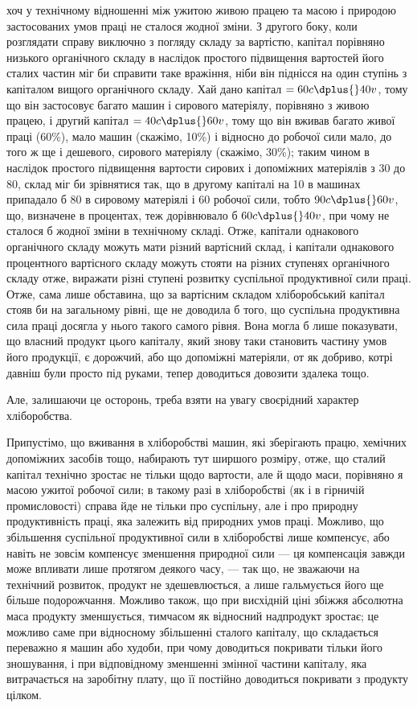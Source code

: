 \parcont{}  %
хоч у технічному відношенні між ужитою живою працею та масою і природою
застосованих умов праці не сталося жодної зміни. З другого боку, коли розглядати
справу виключно з погляду складу за вартістю, капітал порівняно низького
органічного складу в наслідок простого підвищення вартостей його сталих частин
міг би справити таке вражіння, ніби він піднісся на один ступінь з капіталом
вищого органічного складу. Хай дано капітал $= 60c \dplus{} 40v$, тому що він
застосовує багато машин і сирового матеріялу, порівняно з живою працею, і
другий капітал $= 40c \dplus{} 60v$, тому що він вживав багато живої праці (60\%),
мало машин (скажімо, 10\%) і відносно до робочої сили мало, до того ж
ще і дешевого, сирового матеріялу (скажімо, 30\%); таким чином в наслідок простого
підвищення вартости сирових і допоміжних матеріялів з 30 до 80, склад
міг би зрівнятися так, що в другому капіталі на 10 в машинах припадало б 80
в сировому матеріялі і 60 робочої сили, тобто $90c \dplus{} 60v$, що, визначене в процентах,
теж дорівнювало б $60c \dplus{} 40v$, при чому не сталося б жодної зміни в технічному
складі. Отже, капітали однакового органічного складу можуть мати
різний вартісний склад, і капітали однакового процентного вартісного складу
можуть стояти на різних ступенях органічного складу отже, виражати різні ступені
розвитку суспільної продуктивної сили праці. Отже, сама лише обставина,
що за вартісним складом хліборобський капітал стояв би на загальному рівні, ще
не доводила б того, що суспільна продуктивна сила праці досягла у нього
такого самого рівня. Вона могла б лише показувати, що власний продукт цього
капіталу, який знову таки становить частину умов його продукції, є дорожчий,
або що допоміжні матеріяли, от як добриво, котрі давніш були просто під руками,
тепер доводиться довозити здалека тощо.

Але, залишаючи це осторонь, треба взяти на увагу своєрідний характер
хліборобства.

Припустімо, що вживання в хліборобстві машин, які зберігають працю,
хемічних допоміжних засобів тощо, набирають тут ширшого розміру, отже, що сталий
капітал технічно зростає не тільки щодо вартости, але й щодо маси, порівняно
я масою ужитої робочої сили; в такому разі в хліборобстві (як і в гірничій
промисловості) справа йде не тільки про суспільну, але і про природну продуктивність
праці, яка залежить від природних умов праці. Можливо, що збільшення
суспільної продуктивної сили в хліборобстві лише компенсує, або навіть
не зовсім компенсує зменшення природної сили — ця компенсація завжди може
впливати лише протягом деякого часу, — так що, не зважаючи на технічний
розвиток, продукт не здешевлюється, а лише гальмується його ще більше подорожчання.
Можливо також, що при висхідній ціні збіжжя абсолютна маса
продукту зменшується, тимчасом як відносний надпродукт зростає; це можливо
саме при відносному збільшенні сталого капіталу, що складається переважно
я машин або худоби, при чому доводиться покривати тільки його зношування,
і при відповідному зменшенні змінної частини капіталу, яка витрачається на
заробітну плату, що її постійно доводиться покривати з продукту цілком.

